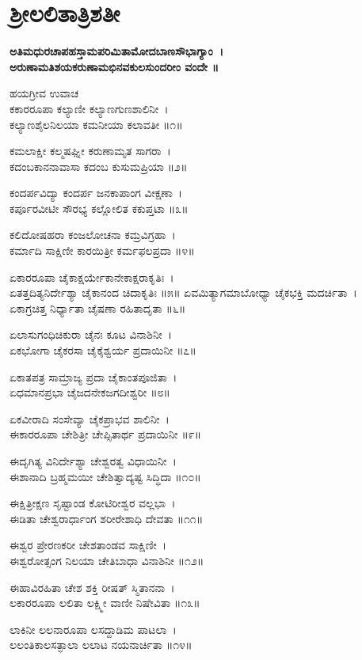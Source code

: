 \section{ಶ್ರೀಲಲಿತಾತ್ರಿಶತೀ}
{\bfseries ಅತಿಮಧುರಚಾಪಹಸ್ತಾಮಪರಿಮಿತಾಮೋದಬಾಣಸೌಭಾಗ್ಯಾಂ~।\\
ಅರುಣಾಮತಿಶಯಕರುಣಾಮಭಿನವಕುಲಸುಂದರೀಂ ವಂದೇ ॥

ಹಯಗ್ರೀವ ಉವಾಚ\\
ಕಕಾರರೂಪಾ ಕಲ್ಯಾಣೀ ಕಲ್ಯಾಣಗುಣಶಾಲಿನೀ~।\\
ಕಲ್ಯಾಣಶೈಲನಿಲಯಾ ಕಮನೀಯಾ ಕಲಾವತೀ ॥೧॥

ಕಮಲಾಕ್ಷೀ ಕಲ್ಮಷಘ್ನೀ ಕರುಣಾಮೃತ ಸಾಗರಾ~।\\
ಕದಂಬಕಾನನಾವಾಸಾ ಕದಂಬ ಕುಸುಮಪ್ರಿಯಾ ॥೨॥

ಕಂದರ್ಪವಿದ್ಯಾ ಕಂದರ್ಪ ಜನಕಾಪಾಂಗ ವೀಕ್ಷಣಾ~।\\
ಕರ್ಪೂರವೀಟೀ ಸೌರಭ್ಯ ಕಲ್ಲೋಲಿತ ಕಕುಪ್ತಟಾ ॥೩॥

ಕಲಿದೋಷಹರಾ ಕಂಜಲೋಚನಾ ಕಮ್ರವಿಗ್ರಹಾ~।\\
ಕರ್ಮಾದಿ ಸಾಕ್ಷಿಣೀ ಕಾರಯಿತ್ರೀ ಕರ್ಮಫಲಪ್ರದಾ ॥೪॥

ಏಕಾರರೂಪಾ ಚೈಕಾಕ್ಷರ್ಯೇಕಾನೇಕಾಕ್ಷರಾಕೃತಿಃ~।\\
ಏತತ್ತದಿತ್ಯನಿರ್ದೇಶ್ಯಾ ಚೈಕಾನಂದ ಚಿದಾಕೃತಿಃ ॥೫॥
\newpage
ಏವಮಿತ್ಯಾಗಮಾಬೋಧ್ಯಾ ಚೈಕಭಕ್ತಿ ಮದರ್ಚಿತಾ~।\\
ಏಕಾಗ್ರಚಿತ್ತ ನಿರ್ಧ್ಯಾತಾ ಚೈಷಣಾ ರಹಿತಾದೃತಾ ॥೬॥

ಏಲಾಸುಗಂಧಿಚಿಕುರಾ ಚೈನಃ ಕೂಟ ವಿನಾಶಿನೀ~।\\
ಏಕಭೋಗಾ ಚೈಕರಸಾ ಚೈಕೈಶ್ವರ್ಯ ಪ್ರದಾಯಿನೀ ॥೭॥

ಏಕಾತಪತ್ರ ಸಾಮ್ರಾಜ್ಯ ಪ್ರದಾ ಚೈಕಾಂತಪೂಜಿತಾ~।\\
ಏಧಮಾನಪ್ರಭಾ ಚೈಜದನೇಕಜಗದೀಶ್ವರೀ ॥೮॥

ಏಕವೀರಾದಿ ಸಂಸೇವ್ಯಾ ಚೈಕಪ್ರಾಭವ ಶಾಲಿನೀ~।\\
ಈಕಾರರೂಪಾ ಚೇಶಿತ್ರೀ ಚೇಪ್ಸಿತಾರ್ಥ ಪ್ರದಾಯಿನೀ ॥೯॥

ಈದೃಗಿತ್ಯ ವಿನಿರ್ದೇಶ್ಯಾ ಚೇಶ್ವರತ್ವ ವಿಧಾಯಿನೀ~।\\
ಈಶಾನಾದಿ ಬ್ರಹ್ಮಮಯೀ ಚೇಶಿತ್ವಾದ್ಯಷ್ಟ ಸಿದ್ಧಿದಾ ॥೧೦॥

ಈಕ್ಷಿತ್ರೀಕ್ಷಣ ಸೃಷ್ಟಾಂಡ ಕೋಟಿರೀಶ್ವರ ವಲ್ಲಭಾ~।\\
ಈಡಿತಾ ಚೇಶ್ವರಾರ್ಧಾಂಗ ಶರೀರೇಶಾಧಿ ದೇವತಾ ॥೧೧॥

ಈಶ್ವರ ಪ್ರೇರಣಕರೀ ಚೇಶತಾಂಡವ ಸಾಕ್ಷಿಣೀ~।\\
ಈಶ್ವರೋತ್ಸಂಗ ನಿಲಯಾ ಚೇತಿಬಾಧಾ ವಿನಾಶಿನೀ ॥೧೨॥

ಈಹಾವಿರಹಿತಾ ಚೇಶ ಶಕ್ತಿ ರೀಷತ್ ಸ್ಮಿತಾನನಾ~।\\
ಲಕಾರರೂಪಾ ಲಲಿತಾ ಲಕ್ಷ್ಮೀ ವಾಣೀ ನಿಷೇವಿತಾ ॥೧೩॥

ಲಾಕಿನೀ ಲಲನಾರೂಪಾ ಲಸದ್ದಾಡಿಮ ಪಾಟಲಾ~।\\
ಲಲಂತಿಕಾಲಸತ್ಫಾಲಾ ಲಲಾಟ ನಯನಾರ್ಚಿತಾ ॥೧೪॥

}
